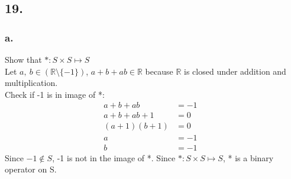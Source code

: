 \documentclass{article}
\begin{document}
\subsection*{19.}
\subsubsection*{a.}
	\begin{addmargin}[1em]{1em}
		Show that $*:S\times S\mapsto S$\\
		Let $a,\ b\in (\mathbb{R} \setminus \{-1\})$, $a+b+ab \in \mathbb{R}$
		because $\mathbb{R}$ is closed under addition and multiplication.\\
		Check if {-1} is in image of *: 
		\begin{align*}
			a+b+ab &= -1&\\
			a+b+ab+1 &= 0&\\
			(a+1)(b+1)&= 0&\\
			a &=-1&\\ 
			b &=-1&
		\end{align*}
		Since $-1 \notin S$, -1 is not in the image of *. Since $*:S\times S\mapsto
		S$, * is a binary operator on S.
	\end{addmargin}
\end{document}
